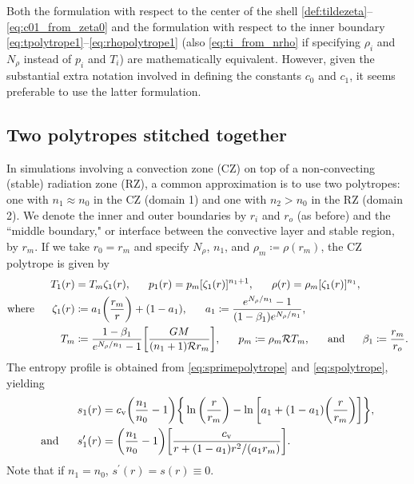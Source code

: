 \documentclass[12pt]{article} %
\newcommand{\cv}{c_{\rm{v}}}
\newcommand{\andd}{\text{and}\ \ \ \ \ }
\newcommand{\five}{\ \ \ \ \ }
\begin{document}
Both the formulation with respect to the center of the shell \eqref{def:tildezeta}--\eqref{eq:c01_from_zeta0} and the formulation with respect to the inner boundary \eqref{eq:tpolytrope1}--\eqref{eq:rhopolytrope1} (also \eqref{eq:ti_from_nrho} if specifying $\rho_i$ and $N_\rho$ instead of $p_i$ and $T_i$) are mathematically equivalent. However, given the substantial extra notation involved in defining the constants $c_0$ and $c_1$, it seems preferable to use the latter formulation. 

\subsection{Two polytropes stitched together}
In simulations involving a convection zone (CZ) on top of a non-convecting (stable) radiation zone (RZ), a common approximation is to use two polytropes: one with $n_1\approx n_0$ in the CZ (domain 1) and one with $n_2>n_0$ in the RZ (domain 2). We denote the inner and outer boundaries by $r_i$ and $r_o$ (as before) and the ``middle boundary," or interface between the convective layer and stable region, by $r_m$. If we take $r_0=r_m$ and specify $N_\rho$, $n_1$, and $\rho_m \coloneqq \rho(r_m)$, the CZ polytrope is given by
\begin{align}
T_1(r) &= T_m\zeta_1(r), \five p_1(r) = p_m[\zeta_1(r)]^{n_1+1}, \five \rho(r) = \rho_m[\zeta_1(r)]^{n_1},\label{eq:poly1}\\
 \text{where}\five \zeta_1(r)&\coloneqq a_1\bigg{(}\frac{r_m}{r}\bigg{)} + (1-a_1),\five a_1 \coloneqq \frac{e^{N_\rho/n_1}-1}{(1-\beta_1)e^{N_\rho/n_1}},\nonumber\\
 T_m &\coloneqq \frac{1-\beta_1}{e^{N_\rho/n_1}-1}\bigg{[}\frac{GM}{(n_1+1)\mathcal{R} r_m}\bigg{]},\five p_m\coloneqq \rho_m\mathcal{R}T_m, \five\andd \beta_1\coloneqq \frac{r_m}{r_o}.
\end{align}
The entropy profile is obtained from \eqref{eq:sprimepolytrope} and \eqref{eq:spolytrope}, yielding 
\begin{align}
s_1(r) &= \cv\bigg{(}\frac{n_1}{n_0} - 1\bigg{)}\bigg{\{}\ln{\bigg{(}\frac{r}{r_m}\bigg{)}} - \ln{\bigg{[}a_1+(1-a_1)\bigg{(}\frac{r}{r_m}\bigg{)}\bigg{]}}\bigg{\}},\nonumber\\
\andd  s_1^\prime(r) &= \bigg{(}\frac{n_1}{n_0} - 1\bigg{)}\bigg{[}\frac{\cv}{r+(1-a_1)r^2/(a_1r_m)}\bigg{]}.
\end{align}
Note that if $n_1=n_0$, $s^\prime(r)=s(r)\equiv 0$. 
\end{document}
